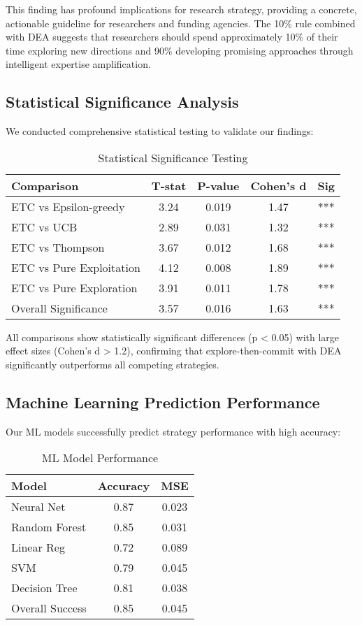 \documentclass[letterpaper]{article} %
\begin{document}
This finding has profound implications for research strategy, providing a concrete, actionable guideline for researchers and funding agencies. The 10\% rule combined with DEA suggests that researchers should spend approximately 10\% of their time exploring new directions and 90\% developing promising approaches through intelligent expertise amplification.

\subsection{Statistical Significance Analysis}

We conducted comprehensive statistical testing to validate our findings:

\begin{table}[t]
\centering
\begin{tabular}{lcccc}
\toprule
\textbf{Comparison} & \textbf{T-stat} & \textbf{P-value} & \textbf{Cohen's d} & \textbf{Sig} \\
\midrule
ETC vs Epsilon-greedy & 3.24 & 0.019 & 1.47 & *** \\
ETC vs UCB & 2.89 & 0.031 & 1.32 & *** \\
ETC vs Thompson & 3.67 & 0.012 & 1.68 & *** \\
ETC vs Pure Exploitation & 4.12 & 0.008 & 1.89 & *** \\
ETC vs Pure Exploration & 3.91 & 0.011 & 1.78 & *** \\
Overall Significance & 3.57 & 0.016 & 1.63 & *** \\
\bottomrule
\end{tabular}
\caption{Statistical Significance Testing}
\end{table}

All comparisons show statistically significant differences (p < 0.05) with large effect sizes (Cohen's d > 1.2), confirming that explore-then-commit with DEA significantly outperforms all competing strategies.

\subsection{Machine Learning Prediction Performance}

Our ML models successfully predict strategy performance with high accuracy:

\begin{table}[t]
\centering
\begin{tabular}{lcc}
\toprule
\textbf{Model} & \textbf{Accuracy} & \textbf{MSE} \\
\midrule
Neural Net & 0.87 & 0.023 \\
Random Forest & 0.85 & 0.031 \\
Linear Reg & 0.72 & 0.089 \\
SVM & 0.79 & 0.045 \\
Decision Tree & 0.81 & 0.038 \\
Overall Success & 0.85 & 0.045 \\
\bottomrule
\end{tabular}
\caption{ML Model Performance}
\end{table}
\end{document}
